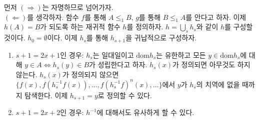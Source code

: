 \documentclass[b5paper, 11pt]{book}
\theoremstyle{definition}
\newenvironment{pf*}{\pushQED{\qed}\pf}
{\popQED\endpf}
\begin{document}
\begin{pf*}
    먼저 $(\Rightarrow)$는 자명하므로 넘어가자. \\ 
    $(\Leftarrow)$를 생각하자. 함수 $f$를 통해 $A \le_1 B$, $g$를 통해 $B \le_1 A$를 안다고 하자. 이제 $h(A) = B$가 되도록 하는 재귀적 함수 $h$를 정의하자. $h = \bigcup_s h_s$와 같이 $h$를 구성할 것이다. $h_0 = \emptyset$이다. 이제 $h_s$를 통해 $h_{s+1}$을 귀납적으로 구성하자. \\
    \begin{enumerate}
        \item $s+1 = 2x + 1$인 경우: $h_s$는 일대일이고 $\mathrm{dom} h_s$는 유한하고 모든 $y \in \mathrm{dom} h_s$에 대해 $y \in A \Leftrightarrow h_s (y) \in B$가 성립한다고 하자. $h_s(x)$가 정의되면 아무것도 하지 않는다. $h_s(x)$가 정의되지 않으면 $\{f(x), f(h_s^{-1} f(x)), \ldots,  f(h_s^{-1} f)^n (x), \ldots \}$에서 $y$가 $h_s$의 치역에 없을 때까지 탐색한다. 이제 $h_{s+1} = y$로 정의할 수 있다.
        \item $s+1 = 2x + 2$인 경우: $h^{-1}$에 대해서도 유사하게 할 수 있다.
    \end{enumerate}

\end{pf*}
\end{document}
